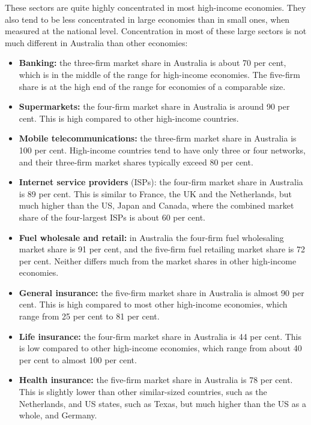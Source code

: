 These sectors are quite highly concentrated in most high-income economies. They also tend to be less concentrated in large economies than in small ones, when measured at the national level. Concentration in most of these large sectors is not much different in Australia than other economies:%
\begin{itemize}
\item \textbf{Banking:} the three-firm market share in Australia is about 70 per cent, which is in the middle of the range for high-income economies. The five-firm share is at the high end of the range for economies of a comparable size. 
\item \textbf{Supermarkets:} the four-firm market share in Australia is around 90 per cent. This is high compared to other high-income countries.
\item \textbf{Mobile telecommunications:} the three-firm market share in Australia is 100 per cent. High-income countries tend to have only three or four networks, and their three-firm market shares typically exceed 80 per cent.
\item \textbf{Internet service providers} (ISPs): the four-firm market share in Australia is 89 per cent. This is similar to France, the UK and the Netherlands, but much higher than the US, Japan and Canada, where the combined market share of the four-largest ISPs is about 60 per cent.\newpage
\item \textbf{Fuel wholesale and retail:} in Australia the four-firm fuel wholesaling market share is 91 per cent, and the five-firm fuel retailing market share is 72 per cent. Neither differs much from the market shares in other high-income economies.
\item \textbf{General insurance:} the five-firm market share in Australia is almost 90 per cent. This is high compared to most other high-income economies, which range from 25 per cent to 81 per cent.
\item \textbf {Life insurance:} the four-firm market share in Australia is 44 per cent. This is low compared to other high-income economies, which range from about 40 per cent to almost 100 per cent.
\item \textbf{Health insurance:} the five-firm market share in Australia is 78 per cent. This is slightly lower than other similar-sized countries, such as the Netherlands, and US states, such as Texas, but much higher than the US as a whole, and Germany.
\end{itemize}

